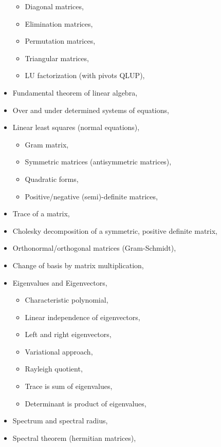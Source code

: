 \begin{itemize}
  \begin{itemize}
  \tightlist
  \item
    Diagonal matrices,
  \item
    Elimination matrices,
  \item
    Permutation matrices,
  \item
    Triangular matrices,
  \item
    LU factorization (with pivots QLUP),
  \end{itemize}
\item
  Fundamental theorem of linear algebra,
\item
  Over and under determined systems of equations,
\item
  Linear least squares (normal equations),

  \begin{itemize}
  \tightlist
  \item
    Gram matrix,
  \item
    Symmetric matrices (antisymmetric matrices),
  \item
    Quadratic forms,
  \item
    Positive/negative (semi)-definite matrices,
  \end{itemize}
\item
  Trace of a matrix,
\item
  Cholesky decomposition of a symmetric, positive definite matrix,
\item
  Orthonormal/orthogonal matrices (Gram-Schmidt),
\item
  Change of basis by matrix multiplication,
\item
  Eigenvalues and Eigenvectors,

  \begin{itemize}
  \tightlist
  \item
    Characteristic polynomial,
  \item
    Linear independence of eigenvectors,
  \item
    Left and right eigenvectors,
  \item
    Variational approach,
  \item
    Rayleigh quotient,
  \item
    Trace is sum of eigenvalues,
  \item
    Determinant is product of eigenvalues,
  \end{itemize}
\item
  Spectrum and spectral radius,
\item
  Spectral theorem (hermitian matrices),


\end{itemize}

